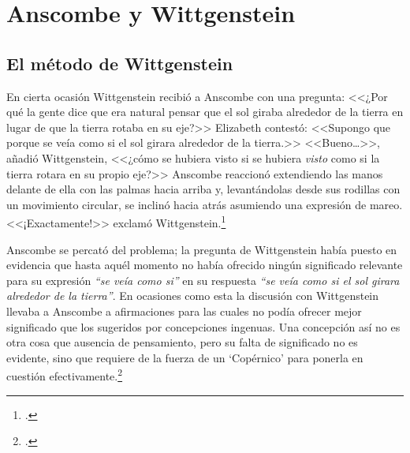 

\section{Anscombe y Wittgenstein}

\subsection{El método de Wittgenstein}

En cierta ocasión Wittgenstein recibió a Anscombe con una pregunta: <<¿Por qué la
gente dice que era natural pensar que el sol giraba alrededor de la tierra en
lugar de que la tierra rotaba en su eje?>> Elizabeth contestó: <<Supongo que
porque se veía como si el sol girara alrededor de la tierra.>> <<Bueno\ldots>>,
añadió Wittgenstein, <<¿cómo se hubiera visto si se hubiera \emph{visto} como si
la tierra rotara en su propio eje?>> Anscombe reaccionó extendiendo las manos
delante de ella con las palmas hacia arriba y, levantándolas desde sus rodillas
con un movimiento circular, se inclinó hacia atrás asumiendo una expresión de
mareo. <<¡Exactamente!>> exclamó Wittgenstein.\footcite[cf.][151]{IWT}


Anscombe se percató del problema; la pregunta de Wittgenstein había puesto en
evidencia que hasta aquél momento no había ofrecido ningún significado relevante
para su expresión \emph{``se veía como si''} en su respuesta \emph{``se veía
    como si el sol girara alrededor de la tierra''}.  En ocasiones como esta la
discusión con Wittgenstein llevaba a Anscombe a afirmaciones para las cuales no
podía ofrecer mejor significado que los sugeridos por concepciones ingenuas. Una
concepción así no es otra cosa que ausencia de pensamiento, pero su falta de
significado no es evidente, sino que requiere de la fuerza de un `Copérnico'
para ponerla en cuestión efectivamente.\footcite[cf. 151]{IWT} 

